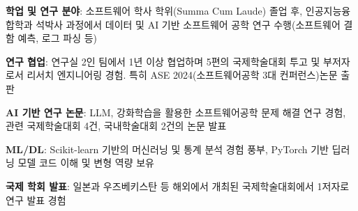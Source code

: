 
\begin{cventries}
    \resumeentry
    {
    \begin{cvitems}
        \item \textbf{학업 및 연구 분야}: 소프트웨어 학사 학위(Summa Cum Laude) 졸업 후, 인공지능융합학과 석박사 과정에서 데이터 및 AI 기반 소프트웨어 공학 연구 수행(소프트웨어 결함 예측, 로그 파싱 등) \vspace{1mm}
        \item \textbf{연구 협업}: 연구실 2인 팀에서 1년 이상 협업하며 5편의 국제학술대회 투고 및 부저자로서 리서치 엔지니어링 경험. 특히 ASE 2024(소프트웨어공학 3대 컨퍼런스)논문 출판\vspace{1mm}
        \item \textbf{AI 기반 연구 논문}: LLM, 강화학습을 활용한 소프트웨어공학 문제 해결 연구 경험, 관련 국제학술대회 4건, 국내학술대회 2건의 논문 발표\vspace{1mm}
        \item \textbf{ML/DL}: Scikit-learn 기반의 머신러닝 및 통계 분석 경험 풍부, PyTorch 기반 딥러닝 모델 코드 이해 및 변형 역량 보유\vspace{1mm}
        \item \textbf{국제 학회 발표}: 일본과 우즈베키스탄 등 해외에서 개최된 국제학술대회에서 1저자로 연구 발표 경험
    \end{cvitems}
    }
    
\end{cventries}

